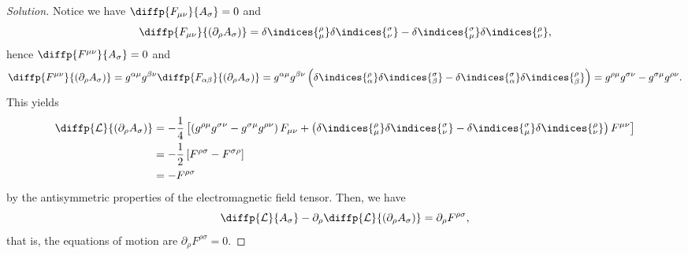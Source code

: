 \begin{proof}[Solution]
    Notice we have \(\diffp{F_{\mu\nu}}{A_\sigma} = 0\) and
    \begin{equation*}
       \diffp{F_{\mu\nu}}{(\partial_\rho A_\sigma)} = \delta\indices{^\rho_\mu}\delta\indices{^\sigma_\nu} - \delta\indices{^\sigma_\mu}\delta\indices{^\rho_\nu},
    \end{equation*}
    hence \(\diffp{F^{\mu\nu}}{A_\sigma} = 0\) and
    \begin{equation*}
        \diffp{F^{\mu\nu}}{(\partial_\rho A_\sigma)} = g^{\alpha \mu} g^{\beta \nu} \diffp{F_{\alpha \beta}}{(\partial_\rho A_\sigma)} = g^{\alpha \mu} g^{\beta \nu} \left(\delta\indices{^\rho_\alpha}\delta\indices{^\sigma_\beta} - \delta\indices{^\sigma_\alpha}\delta\indices{^\rho_\beta}\right) = g^{\rho \mu} g^{\sigma \nu} - g^{\sigma \mu} g^{\rho \nu}.
    \end{equation*}
    This yields
    \begin{align*}
        \diffp{\mathcal{L}}{(\partial_\rho A_\sigma)} &= - \frac14 \left[ \left(g^{\rho\mu} g^{\sigma \nu} - g^{\sigma \mu} g^{\rho \nu}\right)F_{\mu\nu} + \left(\delta\indices{^\rho_\mu}\delta\indices{^\sigma_\nu} - \delta\indices{^\sigma_\mu}\delta\indices{^\rho_\nu}\right)F^{\mu\nu}\right]\\
                                                      &= - \frac12 \left[F^{\rho\sigma} - F^{\sigma \rho}\right]\\
                                                      &= - F^{\rho\sigma}
    \end{align*}
    by the antisymmetric properties of the electromagnetic field tensor. Then, we have 
    \begin{equation}
        \diffp{\mathcal{L}}{A_\sigma} - \partial_\rho\diffp{\mathcal{L}}{(\partial_\rho A_\sigma)} 
        = \partial_\rho F^{\rho \sigma},
    \end{equation}
    that is, the equations of motion are \(\partial_\rho F^{\rho \sigma} = 0\).


\end{proof}
